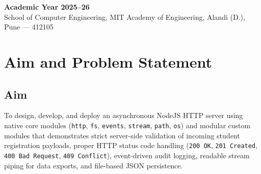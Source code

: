 \documentclass[11pt,a4paper]{article}
\begin{document}
\begin{titlepage}
    \vfill
    {\small \textbf{Academic Year 2025--26}}\\[0.2cm]
    {\footnotesize School of Computer Engineering, MIT Academy of Engineering, Alandi (D.), Pune --- 412105}
\end{titlepage}

\newpage

\section{Aim and Problem Statement}

\subsection{Aim}
To design, develop, and deploy an asynchronous NodeJS HTTP server using native core modules (\texttt{http}, \texttt{fs}, \texttt{events}, \texttt{stream}, \texttt{path}, \texttt{os}) and modular custom modules that demonstrates strict server-side validation of incoming student registration payloads, proper HTTP status code handling (\texttt{200 OK}, \texttt{201 Created}, \texttt{400 Bad Request}, \texttt{409 Conflict}), event-driven audit logging, readable stream piping for data exports, and file-based JSON persistence.
\end{document}
